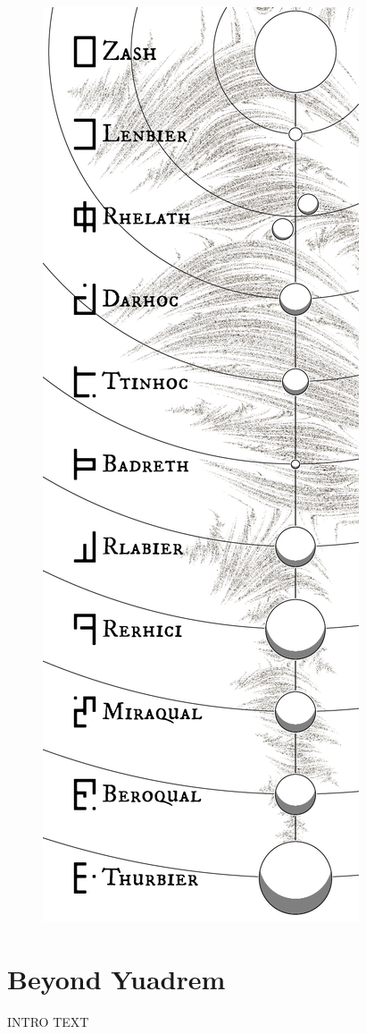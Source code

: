 \begin{figure}[H]
    \centering \includegraphics{01yuadrem/img/40solar_system.png}
\end{figure}
\section{Beyond Yuadrem}

INTRO TEXT




